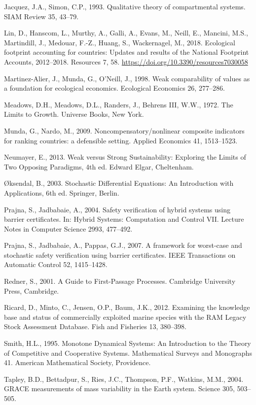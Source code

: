 \documentclass[11pt]{article}
\begin{document}
Jacquez, J.A., Simon, C.P., 1993. Qualitative theory of compartmental systems. SIAM Review 35, 43--79.

Lin, D., Hanscom, L., Murthy, A., Galli, A., Evans, M., Neill, E., Mancini, M.S., Martindill, J., Medouar, F.-Z., Huang, S., Wackernagel, M., 2018. Ecological footprint accounting for countries: Updates and results of the National Footprint Accounts, 2012--2018. Resources 7, 58. \url{https://doi.org/10.3390/resources7030058}

Martinez-Alier, J., Munda, G., O'Neill, J., 1998. Weak comparability of values as a foundation for ecological economics. Ecological Economics 26, 277--286.

Meadows, D.H., Meadows, D.L., Randers, J., Behrens III, W.W., 1972. The Limits to Growth. Universe Books, New York.

Munda, G., Nardo, M., 2009. Noncompensatory/\allowbreak{}nonlinear composite indicators for ranking countries: a defensible setting. Applied Economics 41, 1513--1523.

Neumayer, E., 2013. Weak versus Strong Sustainability: Exploring the Limits of Two Opposing Paradigms, 4th ed. Edward Elgar, Cheltenham.

\O{}ksendal, B., 2003. Stochastic Differential Equations: An Introduction with Applications, 6th ed. Springer, Berlin.

Prajna, S., Jadbabaie, A., 2004. Safety verification of hybrid systems using barrier certificates. In: Hybrid Systems: Computation and Control VII. Lecture Notes in Computer Science 2993, 477--492.

Prajna, S., Jadbabaie, A., Pappas, G.J., 2007. A framework for worst-case and stochastic safety verification using barrier certificates. IEEE Transactions on Automatic Control 52, 1415--1428.

Redner, S., 2001. A Guide to First-Passage Processes. Cambridge University Press, Cambridge.

Ricard, D., Minto, C., Jensen, O.P., Baum, J.K., 2012. Examining the knowledge base and status of commercially exploited marine species with the RAM Legacy Stock Assessment Database. Fish and Fisheries 13, 380--398.

Smith, H.L., 1995. Monotone Dynamical Systems: An Introduction to the Theory of Competitive and Cooperative Systems. Mathematical Surveys and Monographs 41. American Mathematical Society, Providence.

Tapley, B.D., Bettadpur, S., Ries, J.C., Thompson, P.F., Watkins, M.M., 2004. GRACE measurements of mass variability in the Earth system. Science 305, 503--505.
\end{document}
